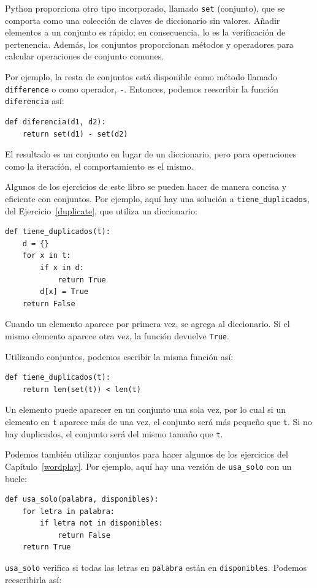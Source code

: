 \documentclass[10pt]{book}
\begin{document}
Python proporciona otro tipo incorporado, llamado {\tt set} (conjunto), que
se comporta como una colección de claves de diccionario sin valores.  Añadir
elementos a un conjunto es rápido; en consecuencia, lo es la verificación de pertenencia.  Además, los conjuntos
proporcionan métodos y operadores para calcular operaciones de conjunto comunes.

Por ejemplo, la resta de conjuntos está disponible como método llamado
{\tt difference} o como operador, {\tt -}.  Entonces, podemos reescribir
la función {\tt diferencia} así:

\begin{verbatim}
def diferencia(d1, d2):
    return set(d1) - set(d2)
\end{verbatim}
%
El resultado es un conjunto en lugar de un diccionario, pero para operaciones como
la iteración, el comportamiento es el mismo.

Algunos de los ejercicios de este libro se pueden hacer de manera concisa y
eficiente con conjuntos.  Por ejemplo, aquí hay una solución a
\verb"tiene_duplicados", del
Ejercicio~\ref{duplicate}, que utiliza un diccionario:

\begin{verbatim}
def tiene_duplicados(t):
    d = {}
    for x in t:
        if x in d:
            return True
        d[x] = True
    return False
\end{verbatim}

Cuando un elemento aparece por primera vez, se agrega al
diccionario.  Si el mismo elemento aparece otra vez, la función devuelve
{\tt True}.

Utilizando conjuntos, podemos escribir la misma función así:

\begin{verbatim}
def tiene_duplicados(t):
    return len(set(t)) < len(t)
\end{verbatim}
%
Un elemento puede aparecer en un conjunto una sola vez, por lo cual si un elemento en {\tt t}
aparece más de una vez, el conjunto será más pequeño que {\tt t}.  Si no
hay duplicados, el conjunto será del mismo tamaño que {\tt t}.

Podemos también utilizar conjuntos para hacer algunos de los ejercicios del
Capítulo~\ref{wordplay}.  Por ejemplo, aquí hay una versión de
\verb"usa_solo" con un bucle:

\begin{verbatim}
def usa_solo(palabra, disponibles):
    for letra in palabra:
        if letra not in disponibles:
            return False
    return True
\end{verbatim}
%
\verb"usa_solo" verifica si todas las letras en {\tt palabra} están
en {\tt disponibles}.  Podemos reescribirla así:
\end{document}
